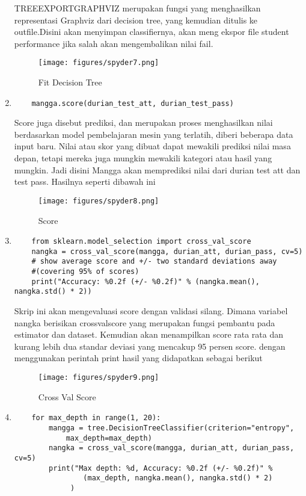 \begin{enumerate}
\par
TREEEXPORTGRAPHVIZ merupakan fungsi yang menghasilkan representasi Graphviz dari decision tree, yang kemudian ditulis ke outfile.Disini akan menyimpan classifiernya, akan meng ekspor file student performance jika salah akan mengembalikan nilai fail.
\begin{figure}[ht]
\centering
\texttt{[image: figures/spyder7.png]}
\caption{Fit Decision Tree}
\label{Spyder}
\end{figure}
\item
\begin{verbatim}
	mangga.score(durian_test_att, durian_test_pass)
\end{verbatim}

\par
Score juga disebut prediksi, dan merupakan proses menghasilkan nilai berdasarkan model pembelajaran mesin yang terlatih, diberi beberapa data input baru. Nilai atau skor yang dibuat dapat mewakili prediksi nilai masa depan, tetapi mereka juga mungkin mewakili kategori atau hasil yang mungkin. Jadi disini Mangga akan memprediksi nilai dari durian test att dan test pass. Hasilnya seperti dibawah ini
\begin{figure}[ht]
\centering
\texttt{[image: figures/spyder8.png]}
\caption{Score}
\label{Spyder}
\end{figure}
\item
\begin{verbatim}
	from sklearn.model_selection import cross_val_score
	nangka = cross_val_score(mangga, durian_att, durian_pass, cv=5)
	# show average score and +/- two standard deviations away 
	#(covering 95% of scores)
	print("Accuracy: %0.2f (+/- %0.2f)" % (nangka.mean(), nangka.std() * 2))
\end{verbatim}

\par
Skrip ini akan mengevaluasi score dengan validasi silang. Dimana variabel nangka berisikan crossvalscore yang merupakan fungsi pembantu pada estimator dan dataset. Kemudian akan menampilkan score rata rata dan kurang lebih dua standar deviasi yang mencakup 95 persen score. dengan menggunakan perintah print hasil yang didapatkan sebagai berikut
\begin{figure}[ht]
\centering
\texttt{[image: figures/spyder9.png]}
\caption{Cross Val Score}
\label{Spyder}
\end{figure}
\item 
\begin{verbatim}
	for max_depth in range(1, 20):
	    mangga = tree.DecisionTreeClassifier(criterion="entropy", 
			max_depth=max_depth)
	    nangka = cross_val_score(mangga, durian_att, durian_pass, cv=5)
	    print("Max depth: %d, Accuracy: %0.2f (+/- %0.2f)" % 
				(max_depth, nangka.mean(), nangka.std() * 2)
			 )
\end{verbatim}


\end{enumerate}
